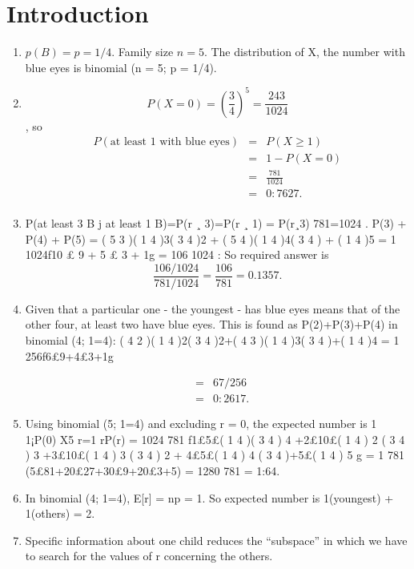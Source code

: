 \documentclass[a4paper,12pt]{article}
\begin{document}
\section{Introduction}
\begin{enumerate}
\item $p(B) = p = 1/4$. Family size $n = 5$. 
The distribution of X, the number with blue
eyes is binomial (n = 5; p = 1/4).

\item \[P(X=0) = \left(\frac{3}{4}\right)^5 = \frac{243}{1024} \], so 
\begin{eqnarray*}
P(\mbox{at least 1 with blue eyes}) 
&=& P(X\geq 1) \\
&=& 1 - P(X=0)\\ 
&=& \frac{781}{1024}\\
&=& 0:7627.\\
\end{eqnarray*}
\item  P(at least 3 B j at least 1 B)=P(r ¸ 3)=P(r ¸ 1) = P(r¸3)
781=1024 .
P(3) + P(4) + P(5) = ( 5
3 )( 1
4 )3( 3
4 )2 + ( 5
4 )( 1
4 )4( 3
4 ) + ( 1
4 )5
= 1
1024f10 £ 9 + 5 £ 3 + 1g = 106
1024 :
So required answer is \[ \frac{106/1024}{781/1024} = \frac{106}{781} = 0.1357. \]
\item Given that a particular one - the youngest - has blue eyes means that of the
other four, at least two have blue eyes. This is found as P(2)+P(3)+P(4) in
binomial (4; 1=4): ( 4
2 )( 1
4 )2( 3
4 )2+( 4
3 )( 1
4 )3( 3
4 )+( 1
4 )4 = 1
256f6£9+4£3+1g


\begin{eqnarray*}
 &=& 67/256 \\
 &=& 0:2617.
\end{eqnarray*}

\item  Using binomial (5; 1=4) and excluding r = 0, the expected number is
1
1¡P(0)
X5
r=1
rP(r) =
1024
781
f1£5£(
1
4
)(
3
4
)
4
+2£10£(
1
4
)
2
(
3
4
)
3
+3£10£(
1
4
)
3
(
3
4
)
2
+
4£5£(
1
4
)
4
(
3
4
)+5£(
1
4
)
5
g =
1
781
(5£81+20£27+30£9+20£3+5) =
1280
781
= 1:64.

\item In binomial (4; 1=4), E[r] = np = 1.
So expected number is 1(youngest) + 1(others) = 2.
\item Specific information about one child reduces the “subspace” in which we
have to search for the values of r concerning the others.
\end{enumerate}
\end{document}
